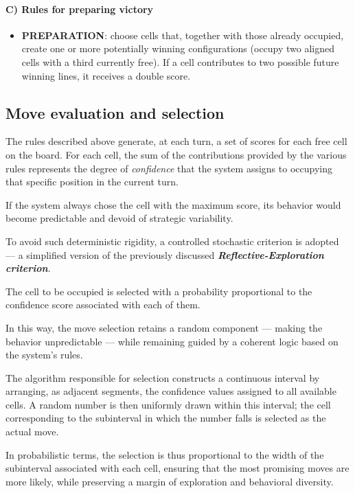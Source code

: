 \documentclass[12pt,a4paper]{article}
\begin{document}
\paragraph{C) Rules for preparing victory}
\begin{itemize}
    \item \textbf{PREPARATION}: choose cells that, together with those already occupied, create one or more potentially winning configurations (occupy two aligned cells with a third currently free).  
    If a cell contributes to two possible future winning lines, it receives a double score.
\end{itemize}

\subsection{Move evaluation and selection}

The rules described above generate, at each turn, a set of scores for each free cell on the board.  
For each cell, the sum of the contributions provided by the various rules represents the degree of \textit{confidence} that the system assigns to occupying that specific position in the current turn.

If the system always chose the cell with the maximum score, its behavior would become predictable and devoid of strategic variability.  

To avoid such deterministic rigidity, a controlled stochastic criterion is adopted — a simplified version of the previously discussed \textit{\textbf{Reflective-Exploration criterion}}.

The cell to be occupied is selected with a probability proportional to the confidence score associated with each of them.

In this way, the move selection retains a random component — making the behavior unpredictable — while remaining guided by a coherent logic based on the system’s rules.

The algorithm responsible for selection constructs a continuous interval by arranging, as adjacent segments, the confidence values assigned to all available cells.  
A random number is then uniformly drawn within this interval;  
the cell corresponding to the subinterval in which the number falls is selected as the actual move.

In probabilistic terms, the selection is thus proportional to the width of the subinterval associated with each cell, ensuring that the most promising moves are more likely, while preserving a margin of exploration and behavioral diversity.
\end{document}
